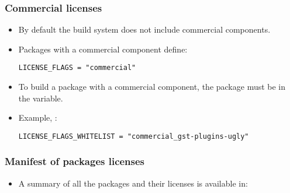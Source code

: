 \begin{frame}[fragile]
  \frametitle{Commercial licenses}
  \begin{itemize}
    \item By default the build system does not include commercial
      components.
    \item Packages with a commercial component define:
      \begin{block}{}
      \begin{verbatim}
LICENSE_FLAGS = "commercial"
      \end{verbatim}
      \end{block}
    \item To build a package with a commercial component, the package
      must be in the  variable.
    \item Example, :
      \begin{block}{}
      \begin{verbatim}
LICENSE_FLAGS_WHITELIST = "commercial_gst-plugins-ugly"
      \end{verbatim}
      \end{block}
  \end{itemize}
\end{frame}

\begin{frame}[fragile]
  \frametitle{Manifest of packages licenses}
  \begin{itemize}
    \item A summary of all the packages and their licenses is
    available in:
  \end{itemize}
\end{frame}
